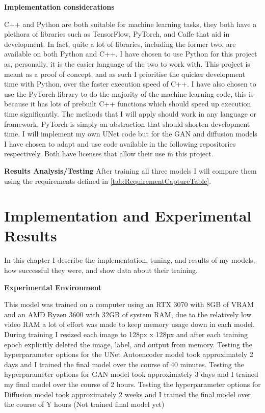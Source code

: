 \documentclass{UoYCSproject}
\begin{document}
\textbf{Implementation considerations}

C++ and Python are both suitable for machine learning tasks, they both have a plethora of libraries such as TensorFlow, PyTorch, and Caffe that aid in development. In fact, quite a lot of libraries, including the former two, are available on both Python and C++. I have chosen to use Python for this project as, personally, it is the easier language of the two to work with. This project is meant as a proof of concept, and as such I prioritise the quicker development time with Python, over the faster execution speed of C++. I have also chosen to use the PyTorch library to do the majority of the machine learning code, this is because it has lots of prebuilt C++ functions which should speed up execution time significantly. The methods that I will apply should work in any language or framework, PyTorch is simply an abstraction that should shorten development time. I will implement my own UNet code but for the GAN and diffusion models I have chosen to adapt and use code available in the following repositories \cite{PytorchPix2Pix, JanspiryPalette} respectively. Both have licenses that allow their use in this project. 

\textbf{Results Analysis/Testing}
After training all three models I will compare them using the requirements defined in \ref{tab:RequirementCaptureTable}.

\chapter{Implementation and Experimental Results}

In this chapter I describe the implementation, tuning, and results of my models, how successful they were, and show data about their training.




\textbf{Experimental Environment}

This model was trained on a computer using an RTX 3070 with 8GB of VRAM and an AMD Ryzen 3600 with 32GB of system RAM, due to the relatively low video RAM a lot of effort was made to keep memory usage down in each model. During training I resized each image to 128px x 128px and after each training epoch explicitly deleted the image, label, and output from memory.
Testing the hyperparameter options for the UNet Autoencoder model took approximately 2 days and I trained the final model over the course of 40 minutes.
Testing the hyperparameter options for GAN model took approximately 3 days and I trained my final model over the course of 2 hours.  
Testing the hyperparameter options for Diffusion model took approximately 2 weeks and I trained the final model over the course of Y hours (Not trained final model yet)
\end{document}
